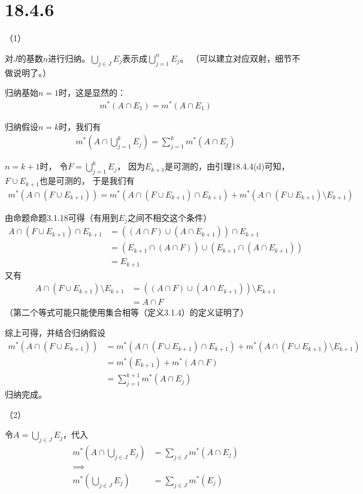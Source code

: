 \documentclass{article}
\begin{document}
\section*{18.4.6}
（1）

对$J$的基数$n$进行归纳。$\bigcup \limits_{j \in J} E_j$表示成$\bigcup \limits_{j = 1}^n E_j$。
（可以建立对应双射，细节不做说明了。）

归纳基始$n = 1$时，这是显然的：
\begin{align*}
  m^{\ast}(A \cap E_1) = m^{\ast}(A \cap E_1)
\end{align*}

归纳假设$n = k$时，我们有
\begin{align*}
  m^{\ast}(A \cap \bigcup\limits_{j = 1}^k E_j) = \sum \limits_{j = 1}^k m^{\ast}(A \cap E_j)
\end{align*}

$n = k + 1$时，
令$F = \bigcup\limits_{j = 1}^k E_j$，
因为$E_{k + 1}$是可测的，由引理18.4.4(d)可知，$F \cup E_{k + 1}$也是可测的，
于是我们有
\begin{align*}
  m^{\ast}(A \cap (F \cup E_{k + 1}))
  = m^{\ast}(A \cap (F \cup E_{k + 1}) \cap E_{k + 1}) + m^{\ast}(A \cap (F \cup E_{k + 1}) \setminus E_{k + 1})
\end{align*}

由命题命题3.1.18可得（有用到$E_j$之间不相交这个条件）
\begin{align*}
  A \cap (F \cup E_{k + 1}) \cap E_{k + 1}
   & = ((A \cap F) \cup (A \cap E_{k + 1})) \cap E_{k + 1}                  \\
   & = (E_{k + 1} \cap (A \cap F)) \cup (E_{k + 1} \cap (A \cap E_{k + 1})) \\
   & = E_{k + 1}
\end{align*}
又有
\begin{align*}
  A \cap (F \cup E_{k + 1}) \setminus E_{k + 1}
   & = ((A \cap F) \cup (A \cap E_{k + 1})) \setminus E_{k + 1} \\
   & = A \cap F
\end{align*}
（第二个等式可能只能使用集合相等（定义3.1.4）的定义证明了）

综上可得，并结合归纳假设
\begin{align*}
  m^{\ast}(A \cap (F \cup E_{k + 1}))
   & = m^{\ast}(A \cap (F \cup E_{k + 1}) \cap E_{k + 1}) + m^{\ast}(A \cap (F \cup E_{k + 1}) \setminus E_{k + 1}) \\
   & = m^{\ast}(E_{k + 1}) + m^{\ast}(A \cap F)                                                                     \\
   & = \sum\limits_{j = 1}^{k + 1} m^{\ast}(A \cap E_{j})
\end{align*}
归纳完成。

（2）

令$A = \bigcup\limits_{j \in J} E_j$，代入
\begin{align*}
  m^{\ast}(A \cap \bigcup\limits_{j \in J} E_j) & = \sum\limits_{j \in J} m^{\ast}(A \cap E_{j}) \\
  \implies                                                                                       \\
  m^{\ast}(\bigcup\limits_{j \in J} E_j)        & = \sum\limits_{j \in J} m^{\ast}(E_{j})
\end{align*}
\end{document}
